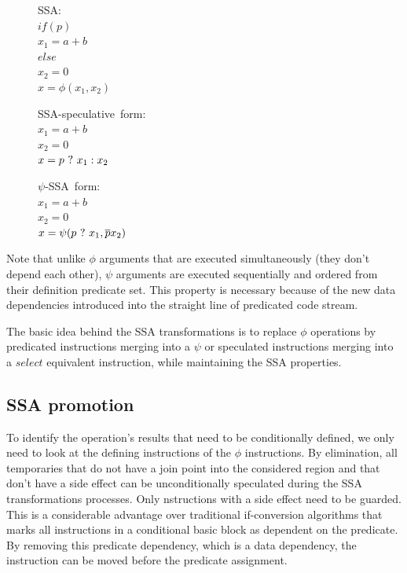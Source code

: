\begin{figure}
\begin{minipage}[t]{3.5cm}
\mbox{SSA:} \\
$ if (p) $ \\
$   x_1 = a+b $ \\
$ else $ \\
$   x_2 = 0 $ \\
$ x = \phi (x_1, x_2) $ \\
\end{minipage}
\begin{minipage}[t]{3.5cm}
\mbox{SSA-speculative form:} \\
$x_1 = a + b $ \\
$x_2 = 0 $ \\
$x = p ~?~  x_1 : x_2$ \\
\end{minipage}
\begin{minipage}[t]{3.5cm}
\mbox{$\psi$-SSA form:} \\
$x_1 = a + b $ \\
$x_2 = 0 $\\
$x = \psi (p ~?~ x_1, \overline{p} x_2) $ \\
\end{minipage}
\end{figure}

Note that unlike $\phi$ arguments that are executed simultaneously (they don't depend each other), $\psi$ arguments are executed sequentially and ordered from their definition predicate set. This property is necessary because of the new data dependencies introduced into the straight line of predicated code stream.

The basic idea behind the SSA transformations is to replace $\phi$ operations by predicated instructions merging into a $\psi$ or speculated instructions merging into a $select$ equivalent instruction, while maintaining the SSA properties.

\subsection{SSA promotion}

To identify the operation's results that need to be conditionally defined, we only need to look at the defining instructions of the $\phi$ instructions. By elimination, all temporaries that do not have a join point into the considered region and that don't have a side effect can be unconditionally speculated during the SSA transformations processes. Only nstructions with a side effect need to be guarded. This is a considerable advantage over traditional if-conversion algorithms that marks all instructions in a conditional basic block as dependent on the predicate. By removing this predicate dependency, which is a data dependency, the instruction can be moved before the predicate assignment.

